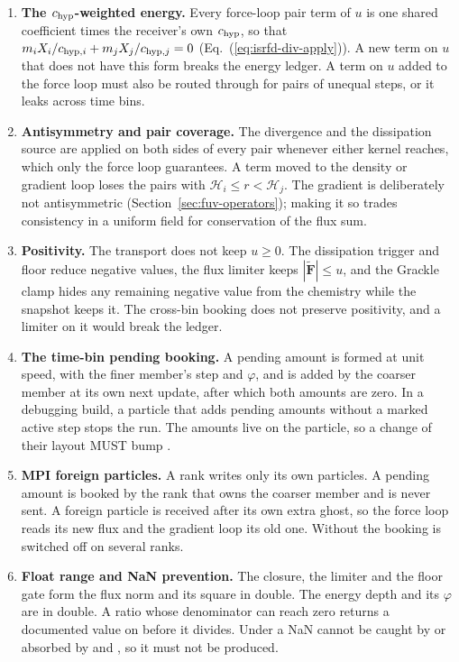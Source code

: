 \begin{enumerate}
  \item \textbf{The $c_{\rm hyp}$-weighted energy.} Every force-loop pair
    term of $u$ is one shared coefficient times the receiver's own
    $c_{\rm hyp}$, so that
    $m_i X_i/c_{{\rm hyp},i} + m_j X_j/c_{{\rm hyp},j} = 0$
    (Eq.~(\ref{eq:isrfd-div-apply})). A new term on $u$ that does not have
    this form breaks the energy ledger. A term on $u$ added to the force
    loop must also be routed through 
    for pairs of unequal steps, or it leaks across time bins.
  \item \textbf{Antisymmetry and pair coverage.} The divergence and the
    dissipation source are applied on both sides of every pair whenever
    either kernel reaches, which only the force loop guarantees. A term
    moved to the density or gradient loop loses the pairs with
    $\mathcal{H}_i \le r < \mathcal{H}_j$. The gradient is deliberately not
    antisymmetric (Section~\ref{sec:fuv-operators}); making it so trades
    consistency in a uniform field for conservation of the flux sum.
  \item \textbf{Positivity.} The transport does not keep $u \ge 0$. The
    dissipation trigger and floor reduce negative values, the flux limiter
    keeps $|\tilde{\boldsymbol F}| \le u$, and the Grackle clamp hides any
    remaining negative value from the chemistry while the snapshot keeps
    it. The cross-bin booking does not preserve positivity, and a limiter
    on it would break the ledger.
  \item \textbf{The time-bin pending booking.} A pending amount is formed
    at unit speed, with the finer member's step and $\varphi$, and is
    added by the coarser member at its own next update, after which both
    amounts are zero. In a debugging build, a particle that adds pending
    amounts without a marked active step stops the run. The amounts live
    on the particle, so a change of their layout MUST bump
    .
  \item \textbf{MPI foreign particles.} A rank writes only its own
    particles. A pending amount is booked by the rank that owns the
    coarser member and is never sent. A foreign particle is received after
    its own extra ghost, so the force loop reads its new flux and the
    gradient loop its old one. Without
     the booking is switched off
    on several ranks.
  \item \textbf{Float range and NaN prevention.} The closure, the limiter
    and the floor gate form the flux norm and its square in double. The
    energy depth and its $\varphi$ are in double. A ratio whose
    denominator can reach zero returns a documented value on
     before it divides.
    Under  a NaN cannot be caught by  or
    absorbed by  and , so it must not be produced.
\end{enumerate}

